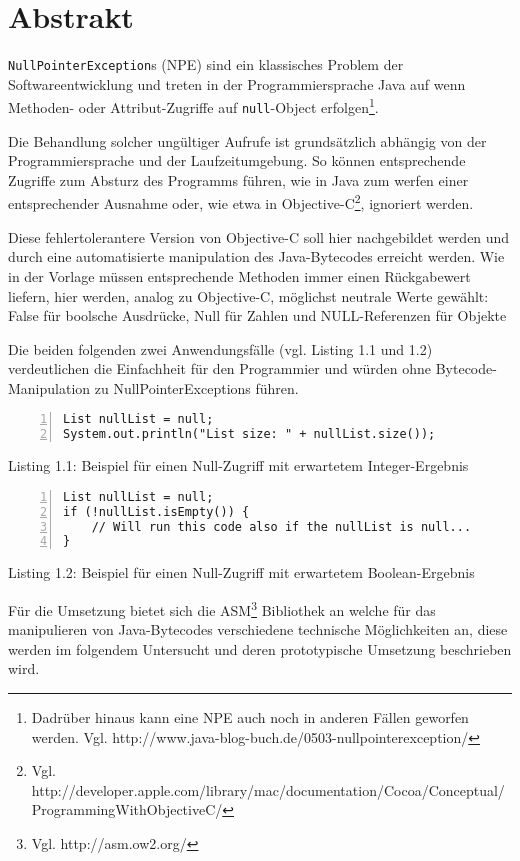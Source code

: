 
\chapter{Abstrakt}

\texttt{NullPointerException}s (NPE) sind ein klassisches Problem der Softwareentwicklung
und treten in der Programmiersprache Java auf wenn Methoden- oder Attribut-Zugriffe
auf \texttt{null}-Object erfolgen\footnote{Dadrüber hinaus kann eine NPE auch
noch in anderen Fällen geworfen werden. Vgl. http://www.java-blog-buch.de/0503-nullpointerexception/}.

Die Behandlung solcher ungültiger Aufrufe ist grundsätzlich abhängig von der
Programmiersprache und der Laufzeitumgebung. So können entsprechende Zugriffe
zum Absturz des Programms führen, wie in Java zum werfen einer entsprechender
Ausnahme oder, wie etwa in Objective-C\footnote{Vgl. http://developer.apple.com/library/mac/documentation/Cocoa/Conceptual/ProgrammingWithObjectiveC/}, ignoriert werden.

Diese fehlertolerantere Version von Objective-C soll hier nachgebildet werden
und durch eine automatisierte manipulation des Java-Bytecodes erreicht werden.
Wie in der Vorlage müssen entsprechende Methoden immer einen Rückgabewert liefern,
hier werden, analog zu Objective-C, möglichst neutrale Werte gewählt:
False für boolsche Ausdrücke, Null für Zahlen und NULL-Referenzen für Objekte

Die beiden folgenden zwei Anwendungsfälle (vgl. Listing 1.1 und 1.2) verdeutlichen
die Einfachheit für den Programmier und würden ohne Bytecode-Manipulation
zu NullPointerExceptions führen.

\begin{lstlisting}[basicstyle=\ttfamily,numbers=left,numberstyle=\footnotesize\ttfamily,backgroundcolor=\color{source}]
List nullList = null;
System.out.println("List size: " + nullList.size());
\end{lstlisting}
\centerline{Listing 1.1: Beispiel für einen Null-Zugriff mit erwartetem Integer-Ergebnis}

\vspace{0.3cm}

\begin{lstlisting}[basicstyle=\ttfamily,numbers=left,numberstyle=\footnotesize\ttfamily,backgroundcolor=\color{source}]
List nullList = null;
if (!nullList.isEmpty()) {
	// Will run this code also if the nullList is null...
}
\end{lstlisting}
\centerline{Listing 1.2: Beispiel für einen Null-Zugriff mit erwartetem Boolean-Ergebnis}

\vspace{0.3cm}

Für die Umsetzung bietet sich die ASM\footnote{Vgl. http://asm.ow2.org/} Bibliothek
an welche für das manipulieren von Java-Bytecodes verschiedene technische Möglichkeiten an,
diese werden im folgendem Untersucht und deren prototypische Umsetzung beschrieben wird.
